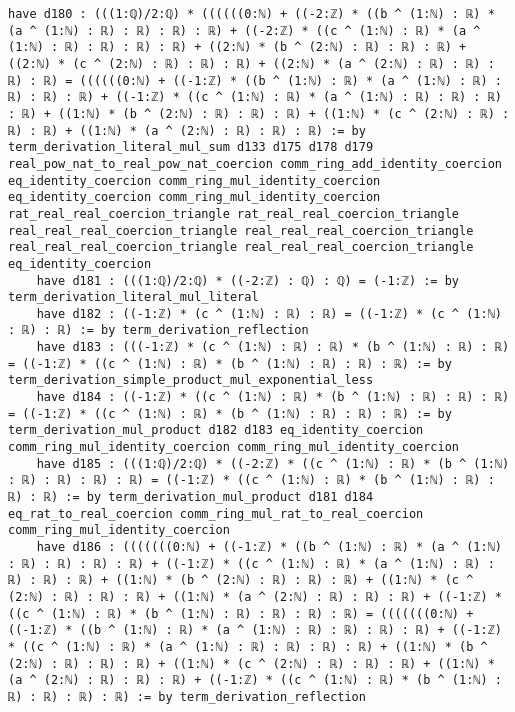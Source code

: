 \documentclass{article}
\begin{document}
\begin{tcolorbox}[colback=white!10, width=\linewidth]
\begin{lstlisting}[language=Lean4]
    have d180 : (((1:ℚ)/2:ℚ) * ((((((0:ℕ) + ((-2:ℤ) * ((b ^ (1:ℕ) : ℝ) * (a ^ (1:ℕ) : ℝ) : ℝ) : ℝ) : ℝ) + ((-2:ℤ) * ((c ^ (1:ℕ) : ℝ) * (a ^ (1:ℕ) : ℝ) : ℝ) : ℝ) : ℝ) + ((2:ℕ) * (b ^ (2:ℕ) : ℝ) : ℝ) : ℝ) + ((2:ℕ) * (c ^ (2:ℕ) : ℝ) : ℝ) : ℝ) + ((2:ℕ) * (a ^ (2:ℕ) : ℝ) : ℝ) : ℝ) : ℝ) = ((((((0:ℕ) + ((-1:ℤ) * ((b ^ (1:ℕ) : ℝ) * (a ^ (1:ℕ) : ℝ) : ℝ) : ℝ) : ℝ) + ((-1:ℤ) * ((c ^ (1:ℕ) : ℝ) * (a ^ (1:ℕ) : ℝ) : ℝ) : ℝ) : ℝ) + ((1:ℕ) * (b ^ (2:ℕ) : ℝ) : ℝ) : ℝ) + ((1:ℕ) * (c ^ (2:ℕ) : ℝ) : ℝ) : ℝ) + ((1:ℕ) * (a ^ (2:ℕ) : ℝ) : ℝ) : ℝ) := by term_derivation_literal_mul_sum d133 d175 d178 d179 real_pow_nat_to_real_pow_nat_coercion comm_ring_add_identity_coercion eq_identity_coercion comm_ring_mul_identity_coercion eq_identity_coercion comm_ring_mul_identity_coercion rat_real_real_coercion_triangle rat_real_real_coercion_triangle real_real_real_coercion_triangle real_real_real_coercion_triangle real_real_real_coercion_triangle real_real_real_coercion_triangle eq_identity_coercion
    have d181 : (((1:ℚ)/2:ℚ) * ((-2:ℤ) : ℚ) : ℚ) = (-1:ℤ) := by term_derivation_literal_mul_literal
    have d182 : ((-1:ℤ) * (c ^ (1:ℕ) : ℝ) : ℝ) = ((-1:ℤ) * (c ^ (1:ℕ) : ℝ) : ℝ) := by term_derivation_reflection
    have d183 : (((-1:ℤ) * (c ^ (1:ℕ) : ℝ) : ℝ) * (b ^ (1:ℕ) : ℝ) : ℝ) = ((-1:ℤ) * ((c ^ (1:ℕ) : ℝ) * (b ^ (1:ℕ) : ℝ) : ℝ) : ℝ) := by term_derivation_simple_product_mul_exponential_less
    have d184 : ((-1:ℤ) * ((c ^ (1:ℕ) : ℝ) * (b ^ (1:ℕ) : ℝ) : ℝ) : ℝ) = ((-1:ℤ) * ((c ^ (1:ℕ) : ℝ) * (b ^ (1:ℕ) : ℝ) : ℝ) : ℝ) := by term_derivation_mul_product d182 d183 eq_identity_coercion comm_ring_mul_identity_coercion comm_ring_mul_identity_coercion
    have d185 : (((1:ℚ)/2:ℚ) * ((-2:ℤ) * ((c ^ (1:ℕ) : ℝ) * (b ^ (1:ℕ) : ℝ) : ℝ) : ℝ) : ℝ) = ((-1:ℤ) * ((c ^ (1:ℕ) : ℝ) * (b ^ (1:ℕ) : ℝ) : ℝ) : ℝ) := by term_derivation_mul_product d181 d184 eq_rat_to_real_coercion comm_ring_mul_rat_to_real_coercion comm_ring_mul_identity_coercion
    have d186 : (((((((0:ℕ) + ((-1:ℤ) * ((b ^ (1:ℕ) : ℝ) * (a ^ (1:ℕ) : ℝ) : ℝ) : ℝ) : ℝ) + ((-1:ℤ) * ((c ^ (1:ℕ) : ℝ) * (a ^ (1:ℕ) : ℝ) : ℝ) : ℝ) : ℝ) + ((1:ℕ) * (b ^ (2:ℕ) : ℝ) : ℝ) : ℝ) + ((1:ℕ) * (c ^ (2:ℕ) : ℝ) : ℝ) : ℝ) + ((1:ℕ) * (a ^ (2:ℕ) : ℝ) : ℝ) : ℝ) + ((-1:ℤ) * ((c ^ (1:ℕ) : ℝ) * (b ^ (1:ℕ) : ℝ) : ℝ) : ℝ) : ℝ) = (((((((0:ℕ) + ((-1:ℤ) * ((b ^ (1:ℕ) : ℝ) * (a ^ (1:ℕ) : ℝ) : ℝ) : ℝ) : ℝ) + ((-1:ℤ) * ((c ^ (1:ℕ) : ℝ) * (a ^ (1:ℕ) : ℝ) : ℝ) : ℝ) : ℝ) + ((1:ℕ) * (b ^ (2:ℕ) : ℝ) : ℝ) : ℝ) + ((1:ℕ) * (c ^ (2:ℕ) : ℝ) : ℝ) : ℝ) + ((1:ℕ) * (a ^ (2:ℕ) : ℝ) : ℝ) : ℝ) + ((-1:ℤ) * ((c ^ (1:ℕ) : ℝ) * (b ^ (1:ℕ) : ℝ) : ℝ) : ℝ) : ℝ) := by term_derivation_reflection

\end{lstlisting}
\end{tcolorbox}
\end{document}
